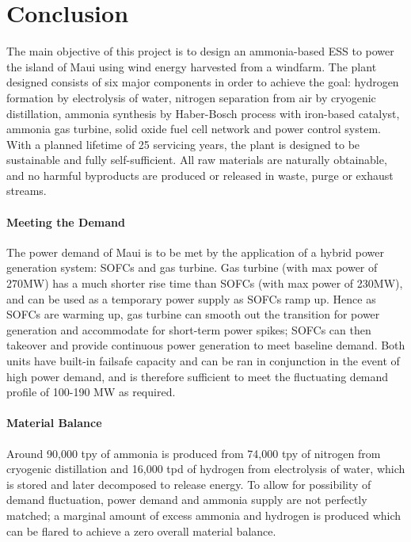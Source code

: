 \let\subsection\paragraph
%

\section{Conclusion}
The main objective of this project is to design an ammonia-based ESS to power the island of Maui using wind energy harvested from a windfarm. The plant designed consists of six major components in order to achieve the goal: hydrogen formation by electrolysis of water, nitrogen separation from air by cryogenic distillation, ammonia synthesis by Haber-Bosch process with iron-based catalyst, ammonia gas turbine, solid oxide fuel cell network and power control system. With a planned lifetime of 25 servicing years, the plant is designed to be sustainable and fully self-sufficient. All raw materials are naturally obtainable, and no harmful byproducts are produced or released in waste, purge or exhaust streams. 
\subsection{Meeting the Demand}
The power demand of Maui is to be met by the application of a hybrid power generation system: SOFCs and gas turbine. Gas turbine (with max power of 270MW) has a much shorter rise time than SOFCs (with max power of 230MW), and can be used as a temporary power supply as SOFCs ramp up. Hence as SOFCs are warming up, gas turbine can smooth out the transition for power generation and accommodate for short-term power spikes; SOFCs can then takeover and provide continuous power generation to meet baseline demand. Both units have built-in failsafe capacity and can be ran in conjunction in the event of high power demand, and is therefore sufficient to meet the fluctuating demand profile of 100-190 MW as required.
\subsection{Material Balance}
Around 90,000 tpy of ammonia is produced from 74,000 tpy of nitrogen from cryogenic distillation and 16,000 tpd of hydrogen from electrolysis of water, which is stored and later decomposed to release energy. To allow for possibility of demand fluctuation, power demand and ammonia supply are not perfectly matched; a marginal amount of excess ammonia and hydrogen is produced which can be flared to achieve a zero overall material balance.
